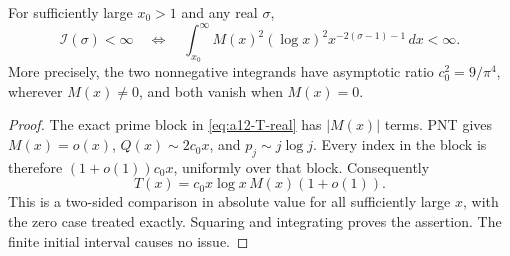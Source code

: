 \begin{proposition}
\label{prop:a12-energy-comparison}
For sufficiently large $x_0>1$ and any real $\sigma$,
\begin{equation}
\label{eq:a12-energy-comparison}
\mathcal I(\sigma)<\infty
\quad\Longleftrightarrow\quad
\int_{x_0}^\infty M(x)^2(\log x)^2
x^{-2(\sigma-1)-1}\,dx<\infty.
\end{equation}
More precisely, the two nonnegative integrands have asymptotic ratio
$c_0^2=9/\pi^4$, wherever $M(x)\ne0$, and both vanish when $M(x)=0$.
\end{proposition}
\begin{proof}
The exact prime block in \eqref{eq:a12-T-real} has $|M(x)|$ terms.
PNT gives $M(x)=o(x)$, $Q(x)\sim2c_0x$, and
$p_j\sim j\log j$. Every index in the block is therefore
$(1+o(1))c_0x$, uniformly over that block. Consequently
\begin{equation}
\label{eq:a12-T-asymptotic}
T(x)=c_0x\log x\,M(x)(1+o(1)).
\end{equation}
This is a two-sided comparison in absolute value for all sufficiently
large $x$, with the zero case treated exactly. Squaring and integrating
proves the assertion. The finite initial interval causes no issue.
\end{proof}

